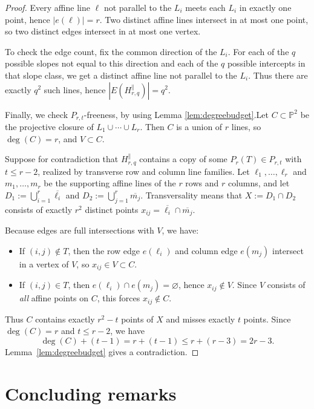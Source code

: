 \documentclass[11pt]{article}
\theoremstyle{definition}
\theoremstyle{remark}
\newcommand{\PP}{\mathbb{P}}
\begin{document}
\begin{proof}
Every affine line $\ell$ not parallel to the $L_i$ meets each $L_i$ in exactly one point, hence $|e(\ell)|=r$.
Two distinct affine lines intersect in at most one point, so two distinct edges intersect in at most one vertex.

To check the edge count, fix the common direction of the $L_i$.
For each of the $q$ possible slopes not equal to this direction and each of the $q$ possible intercepts in that slope
class, we get a distinct affine line not parallel to the $L_i$.
Thus there are exactly $q^2$ such lines, hence $|E(H^{\parallel}_{r,q})|=q^2$.

Finally, we check $P_{r,t}$-freeness, by using Lemma \ref{lem:degreebudget}.Let $C\subset\PP^2$ be the projective closure of $L_1\cup\cdots\cup L_r$.
Then $C$ is a union of $r$ lines, so $\deg(C)=r$, and $V\subset C$.

Suppose for contradiction that $H^{\parallel}_{r,q}$ contains a copy of some $P_r(T)\in P_{r,t}$ with $t\le r-2$,
realized by transverse row and column line families.
Let $\ell_1,\dots,\ell_r$ and $m_1,\dots,m_r$ be the supporting affine lines of the $r$ rows and $r$ columns,
and let $D_1:=\bigcup_{i=1}^r\overline{\ell_i}$ and $D_2:=\bigcup_{j=1}^r\overline{m_j}$.
Transversality means that $X:=D_1\cap D_2$ consists of exactly $r^2$ distinct points $x_{ij}=\overline{\ell_i}\cap\overline{m_j}$.

Because edges are full intersections with $V$, we have:
\begin{itemize}[leftmargin=2em]
\item If $(i,j)\notin T$, then the row edge $e(\ell_i)$ and column edge $e(m_j)$ intersect in a vertex of $V$,
so $x_{ij}\in V\subset C$.
\item If $(i,j)\in T$, then $e(\ell_i)\cap e(m_j)=\varnothing$, hence $x_{ij}\notin V$.
Since $V$ consists of \emph{all} affine points on $C$, this forces $x_{ij}\notin C$.
\end{itemize}
Thus $C$ contains exactly $r^2-t$ points of $X$ and misses exactly $t$ points.
Since $\deg(C)=r$ and $t\le r-2$, we have
\[
\deg(C)+(t-1)=r+(t-1)\le r+(r-3)=2r-3.
\]
Lemma~\ref{lem:degreebudget} gives a contradiction.
\end{proof}

\section{Concluding remarks}\label{sec:concluding}
\end{document}
